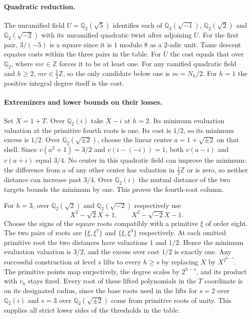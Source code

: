 \paragraph{Quadratic reduction.}
The unramified field $U=\mathbb Q_2(\sqrt5)$ identifies each of
$\mathbb Q_2(\sqrt{-1})$, $\mathbb Q_2(\sqrt2)$ and $\mathbb Q_2(\sqrt{-2})$
with its unramified quadratic twist after adjoining $U$. For the first
pair, $3/(-5)$ is a square since it is $1$ modulo $8$ as a $2$-adic unit.
Tame descent equates costs within the three pairs in the table.
For $U$ the cost equals that over $\mathbb Q_2$, where $mr\in\mathbb Z$
forces it to be at least one. For any ramified quadratic field and $h\ge2$,
$mr\in\tfrac12\mathbb Z$, so the only candidate below one is $m=N_h/2$.
For $h=1$ the positive integral degree itself is the cost.

\paragraph{Extremizers and lower bounds on their losses.}
Set $X=1+T$. Over $\mathbb Q_2(i)$ take $X-i$ at $h=2$.
Its minimum evaluation valuation at the primitive fourth roots is one.
Its cost is $1/2$, so its minimum excess is $1/2$.
Over $\mathbb Q_2(\sqrt{\pm2})$, choose the linear center
$a=1+\sqrt{\pm2}$ on that shell. Since $v(a^2+1)=3/2$ and
$v(i-(-i))=1$, both $v(a-i)$ and $v(a+i)$ equal $3/4$.
No center in this quadratic field can improve the minimum: the difference
from $a$ of any other center has valuation in $\tfrac12\mathbb Z$ or is
zero, so neither distance can increase past $3/4$.
Over $\mathbb Q_2(i)$ the mutual distance of the two targets bounds the
minimum by one. This proves the fourth-root column.

For $h=3$, over $\mathbb Q_2(\sqrt2)$ and
$\mathbb Q_2(\sqrt{-2})$ respectively use
\[
                     X^2-\sqrt2 X+1,\qquad X^2-\sqrt{-2} X-1 .
\]
Choose the signs of the square roots compatibly with a primitive $\xi$ of
order eight. The two pairs of roots are $\{\xi,\xi^7\}$ and
$\{\xi,\xi^3\}$ respectively. At each omitted primitive root the two
distances have valuations $1$ and $1/2$. Hence the minimum evaluation
valuation is $3/2$, and the excess over cost $1/2$ is exactly one.
Any successful construction at level $s$ lifts to every $h\ge s$ by
replacing $X$ by $X^{2^{h-s}}$. The primitive points map surjectively,
the degree scales by $2^{h-s}$, and its product with $r_h$ stays fixed.
Every root of these lifted polynomials in the $T$ coordinate is on its
designated radius, since the base roots used in the lifts for
$s=2$ over $\mathbb Q_2(i)$ and $s=3$ over $\mathbb Q_2(\sqrt{\pm2})$
come from primitive roots of unity. This supplies all strict lower sides
of the thresholds in the table.

